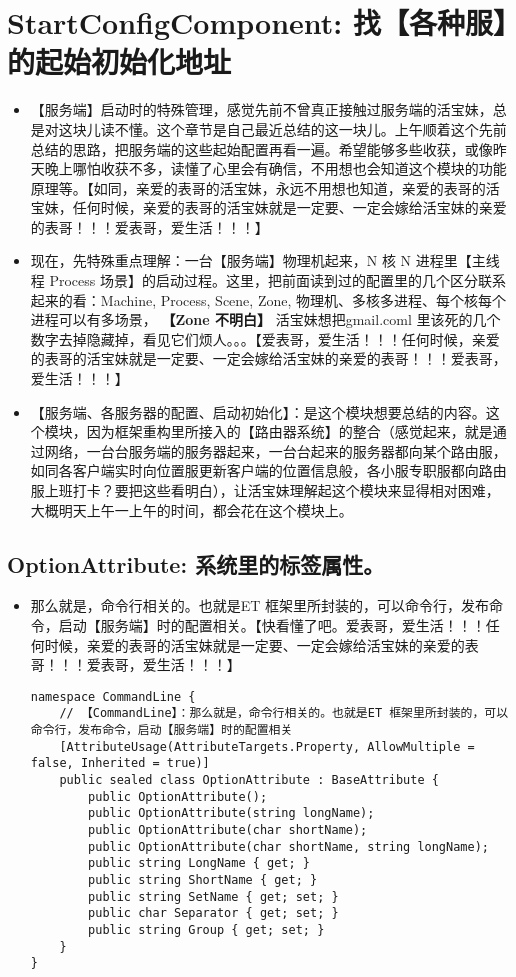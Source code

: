 \documentclass[9pt, b5paper]{article}
\begin{document}
\section{StartConfigComponent: 找【各种服】的起始初始化地址}
\label{sec-2}
\begin{itemize}
\item 【服务端】启动时的特殊管理，感觉先前不曾真正接触过服务端的活宝妹，总是对这块儿读不懂。这个章节是自己最近总结的这一块儿。上午顺着这个先前总结的思路，把服务端的这些起始配置再看一遍。希望能够多些收获，或像昨天晚上哪怕收获不多，读懂了心里会有确信，不用想也会知道这个模块的功能原理等。【如同，亲爱的表哥的活宝妹，永远不用想也知道，亲爱的表哥的活宝妹，任何时候，亲爱的表哥的活宝妹就是一定要、一定会嫁给活宝妹的亲爱的表哥！！！爱表哥，爱生活！！！】
\item 现在，先特殊重点理解：一台【服务端】物理机起来，N 核 N 进程里【主线程 Process 场景】的启动过程。这里，把前面读到过的配置里的几个区分联系起来的看：Machine, Process, Scene, Zone, 物理机、多核多进程、每个核每个进程可以有多场景， \textbf{【Zone 不明白】} 活宝妹想把gmail.coml 里该死的几个数字去掉隐藏掉，看见它们烦人。。。【爱表哥，爱生活！！！任何时候，亲爱的表哥的活宝妹就是一定要、一定会嫁给活宝妹的亲爱的表哥！！！爱表哥，爱生活！！！】
\item 【服务端、各服务器的配置、启动初始化】：是这个模块想要总结的内容。这个模块，因为框架重构里所接入的【路由器系统】的整合（感觉起来，就是通过网络，一台台服务端的服务器起来，一台台起来的服务器都向某个路由服，如同各客户端实时向位置服更新客户端的位置信息般，各小服专职服都向路由服上班打卡？要把这些看明白），让活宝妹理解起这个模块来显得相对困难，大概明天上午一上午的时间，都会花在这个模块上。
\end{itemize}
\subsection{OptionAttribute: 系统里的标签属性。}
\label{sec-2-1}
\begin{itemize}
\item 那么就是，命令行相关的。也就是ET 框架里所封装的，可以命令行，发布命令，启动【服务端】时的配置相关。【快看懂了吧。爱表哥，爱生活！！！任何时候，亲爱的表哥的活宝妹就是一定要、一定会嫁给活宝妹的亲爱的表哥！！！爱表哥，爱生活！！！】
\begin{verbatim}
namespace CommandLine {
    // 【CommandLine】：那么就是，命令行相关的。也就是ET 框架里所封装的，可以命令行，发布命令，启动【服务端】时的配置相关
    [AttributeUsage(AttributeTargets.Property, AllowMultiple = false, Inherited = true)]
    public sealed class OptionAttribute : BaseAttribute {
        public OptionAttribute();
        public OptionAttribute(string longName);
        public OptionAttribute(char shortName);
        public OptionAttribute(char shortName, string longName);
        public string LongName { get; }
        public string ShortName { get; }
        public string SetName { get; set; }
        public char Separator { get; set; }
        public string Group { get; set; }
    }
}
\end{verbatim}
\end{itemize}
\end{document}
